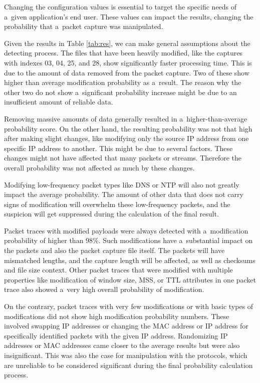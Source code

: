 \documentclass[
  printed,     %
  color,       %
  oneside,     %
  nosansbold,  %
  nocolorbold, %
  nolof,         %
  nolot,         %
]{fithesis4}
\begin{document}
Changing the configuration values is essential to target the specific needs of a~given application's end user. These values can impact the results, changing the probability that a~packet capture was manipulated.

Given the results in Table \ref{tab:res}, we can make general assumptions about the detecting process. The files that have been heavily modified, like the captures with indexes 03, 04, 25, and 28, show significantly faster processing time. This is due to the amount of data removed from the packet capture. Two of these show higher than average modification probability as a~result. The reason why the other two do not show a~significant probability increase might be due to an insufficient amount of reliable data.

Removing massive amounts of data generally resulted in a~higher-than-average probability score. On the other hand, the resulting probability was not that high after making slight changes, like modifying only the source IP address from one specific IP address to another. This might be due to several factors. These changes might not have affected that many packets or streams. Therefore the overall probability was not affected as much by these changes. 

Modifying low-frequency packet types like DNS or NTP will also not greatly impact the average probability. The amount of other data that does not carry signs of modification will overwhelm these low-frequency packets, and the suspicion will get suppressed during the calculation of the final result.

Packet traces with modified payloads were always detected with a~modification probability of higher than 98\%. Such modifications have a~substantial impact on the packets and also the packet capture file itself. The packets will have mismatched lengths, and the capture length will be affected, as well as checksums and file size context. Other packet traces that were modified with multiple properties like modification of window size, MSS, or TTL attributes in one packet trace also showed a~very high overall probability of modification.

On the contrary, packet traces with very few modifications or with basic types of modifications did not show high modification probability numbers. These involved swapping IP addresses or changing the MAC address or IP address for specifically identified packets with the given IP address. Randomizing IP addresses or MAC addresses came closer to the average results but were also insignificant. This was also the case for manipulation with the protocols, which are unreliable to be considered significant during the final probability calculation process.
\end{document}
